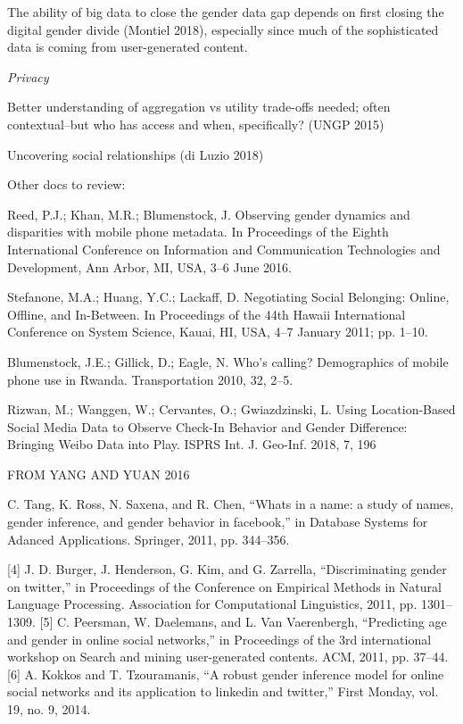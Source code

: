 \documentclass{article}
\begin{document}
The ability of big data to close the gender data gap depends on first closing the digital gender divide (Montiel 2018), especially since much of the sophisticated data is coming from user-generated content.


\textit{Privacy}

Better understanding of aggregation vs utility trade-offs needed; often contextual--but who has access and when, specifically? (UNGP 2015)

Uncovering social relationships (di Luzio 2018)


Other docs to review:

Reed, P.J.; Khan, M.R.; Blumenstock, J. Observing gender dynamics and disparities with mobile phone metadata. In Proceedings of the Eighth International Conference on Information and Communication Technologies and Development, Ann Arbor, MI, USA, 3–6 June 2016.

Stefanone, M.A.; Huang, Y.C.; Lackaff, D. Negotiating Social Belonging: Online, Offline, and In-Between. In Proceedings of the 44th Hawaii International Conference on System Science, Kauai, HI, USA, 4–7 January 2011; pp. 1–10.

Blumenstock, J.E.; Gillick, D.; Eagle, N. Who’s calling? Demographics of mobile phone use in Rwanda. Transportation 2010, 32, 2–5.

Rizwan, M.; Wanggen, W.; Cervantes, O.; Gwiazdzinski, L. Using Location-Based Social Media Data to Observe Check-In Behavior and Gender Difference: Bringing Weibo Data into Play. ISPRS Int. J. Geo-Inf. 2018, 7, 196

FROM YANG AND YUAN 2016

C. Tang, K. Ross, N. Saxena, and R. Chen, “Whats in a name: a study of names, gender inference, and gender behavior in facebook,” in Database Systems for Adanced Applications. Springer, 2011, pp. 344–356.

[4] J. D. Burger, J. Henderson, G. Kim, and G. Zarrella, “Discriminating gender on twitter,” in Proceedings of the Conference on Empirical Methods in Natural Language Processing. Association for Computational Linguistics, 2011, pp. 1301–1309. [5] C. Peersman, W. Daelemans, and L. Van Vaerenbergh, “Predicting age and gender in online social networks,” in Proceedings of the 3rd international workshop on Search and mining user-generated contents. ACM, 2011, pp. 37–44. [6] A. Kokkos and T. Tzouramanis, “A robust gender inference model for online social networks and its application to linkedin and twitter,” First Monday, vol. 19, no. 9, 2014.
\end{document}

